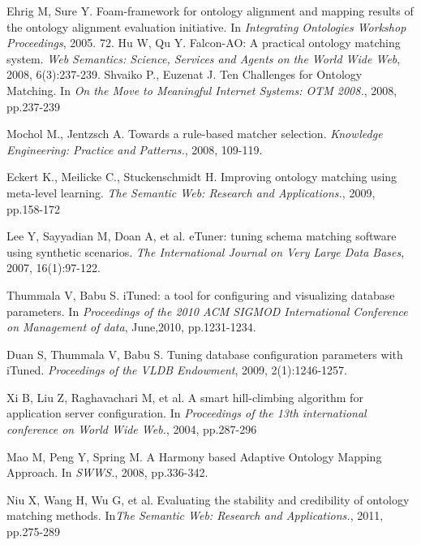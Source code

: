 \documentclass[twoside]{article}
\begin{document}
\begin{multicols}{2}
\begin{thebibliography}{99}
 Ehrig M, Sure Y. Foam-framework for ontology alignment and mapping results of the ontology alignment evaluation initiative. In {\it Integrating Ontologies Workshop Proceedings}, 2005. 72.
 Hu W, Qu Y. Falcon-AO: A practical ontology matching system. {\it Web Semantics: Science, Services and Agents on the World Wide Web}, 2008, 6(3):237-239.
Shvaiko P., Euzenat J. Ten Challenges for Ontology Matching. In {\it On the Move to Meaningful Internet Systems: OTM 2008.}, 2008, pp.237-239 

Mochol M., Jentzsch A. Towards a rule-based matcher selection. {\it Knowledge Engineering: Practice and Patterns.}, 2008, 109-119. 

Eckert K., Meilicke C., Stuckenschmidt H. Improving ontology matching using meta-level learning. {\it The Semantic Web: Research and Applications.}, 2009, pp.158-172

Lee Y, Sayyadian M, Doan A, et al. eTuner: tuning schema matching software using synthetic scenarios. {\it The International Journal on Very Large Data Bases}, 2007, 16(1):97-122.

Thummala V, Babu S. iTuned: a tool for configuring and visualizing database parameters. In {\it Proceedings of the 2010 ACM SIGMOD International Conference on Management of data}, June,2010, pp.1231-1234.

Duan S, Thummala V, Babu S. Tuning database configuration parameters with iTuned. {\it Proceedings of the VLDB Endowment}, 2009, 2(1):1246-1257.

Xi B, Liu Z, Raghavachari M, et al. A smart hill-climbing algorithm for application server configuration. In {\it Proceedings of the 13th international conference on World Wide Web.}, 2004, pp.287-296


Mao M, Peng Y, Spring M. A Harmony based Adaptive Ontology Mapping Approach. In {\it SWWS.}, 2008, pp.336-342.

Niu X, Wang H, Wu G, et al. Evaluating the stability and credibility of ontology matching methods. In{\it The Semantic Web: Research and Applications.}, 2011, pp.275-289


\end{thebibliography}
\end{multicols}
\end{document}
